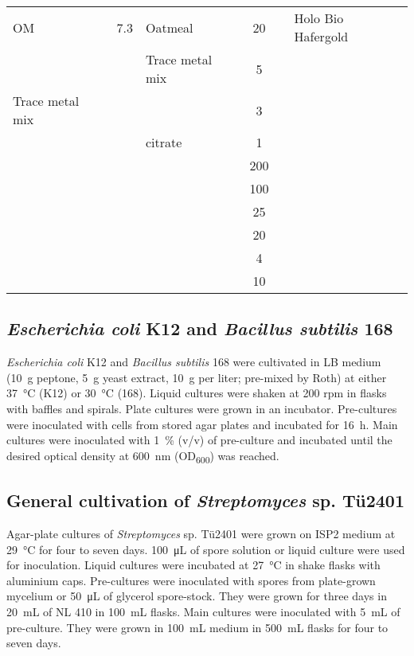 \begin{table}[htbp]
\begin{tabularx}{\textwidth}{XSXS[table-format=3.0]@{\,}s[table-unit-alignment = left]X}
			\midrule
			OM 		& 7.3		& Oatmeal				& 20	& \gram	&	Holo Bio Hafergold	\\
					&			& Trace metal mix		& 5		& \milli\liter	&\\
			\midrule
			Trace metal mix &	& 	& 3		& \gram	&		\\
			 		&			&  citrate	& 1		& \gram	&		\\
			 		&			& 		& 200	& \milli\gram	&\\
			 		&			& 			& 100	& \milli\gram	&\\
			 		&			& 	& 25	& \milli\gram	&\\
			 		&			& 	& 20	& \milli\gram	&\\
			 		&			& 	& 4		& \milli\gram	&\\
			 		&			& 	& 10	& \milli\gram	&\\
			\bottomrule
		\end{tabularx}
	\end{table}


	\subsection{\emph{Escherichia coli} K12 and \emph{Bacillus subtilis} 168} %
	\label{sub:escherichia_coli_k12}
		\emph{Escherichia coli} K12 and \emph{Bacillus subtilis} 168 were cultivated in LB medium (\SI{10}{\gram} peptone, \SI{5}{\gram} yeast extract, \SI{10}{\gram}  per liter; pre-mixed by Roth) at either \SI{37}{\celsius} (K12) or \SI{30}{\celsius} (168). Liquid cultures were shaken at 200 rpm in flasks with baffles and spirals. Plate cultures were grown in an incubator. Pre-cultures were inoculated with cells from stored agar plates and incubated for \SI{16}{\hour}. Main cultures were inoculated with 1~\% (v/v) of pre-culture and incubated until the desired optical density at \SI{600}{\nano\meter} (OD\textsubscript{600}) was reached.

	\subsection{General cultivation of \emph{Streptomyces} sp. Tü2401} %
	\label{sub:methods_general_cult}
		Agar-plate cultures of \textit{Streptomyces} sp. Tü2401 were grown on ISP2 medium at \SI{29}{\celsius} for four to seven days. \SI{100}{\micro\liter} of spore solution or liquid culture were used for inoculation. Liquid cultures were incubated at \SI{27}{\celsius} in shake flasks with aluminium caps. Pre-cultures were inoculated with spores from plate-grown mycelium or \SI{50}{\micro\liter} of glycerol spore-stock. They were grown for three days in \SI{20}{\milli\liter} of NL 410 in \SI{100}{\milli\liter} flasks. Main cultures were inoculated with \SI{5}{\milli\liter} of pre-culture. They were grown in \SI{100}{\milli\liter} medium in \SI{500}{\milli\liter} flasks for four to seven days.
		
